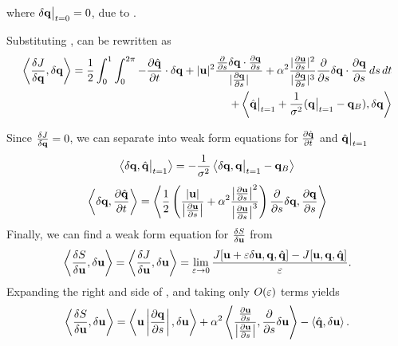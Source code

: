 \documentclass[a4paper, 12pt]{article}
\begin{document}
where $\delta \mathbf{q}\big|_{t=0} = 0$, due to .

Substituting ,  can be rewritten as 
\begin{equation}
\begin{split}
  \label{eq:dJdq-adjoint}
  \left\langle \frac{\delta J}{\delta \mathbf{q}}, \delta \mathbf{q} \right\rangle =
  \frac{1}{2}\int^1_0\int^{2\pi}_0 -\frac{\partial \hat{\mathbf{q}}}{\partial t}\cdot \delta \mathbf{q} + |\mathbf{u}|^2
  \frac{\frac{\partial }{\partial s}\delta \mathbf{q} \cdot \frac{\partial \mathbf{q}}{\partial s}}{|\frac{\partial \mathbf{q}}{\partial s}|}
    + \alpha^2 \frac{|\frac{\partial \mathbf{u}}{\partial s}|^2}{|\frac{\partial \mathbf{q}}{\partial s}|^3} \frac{\partial }{\partial s}\delta \mathbf{q} \cdot \frac{\partial \mathbf{q}}{\partial s} \,ds\,dt \\
    + \left\langle  \hat{\mathbf{q}} \big|_{t=1} + \frac{1}{\sigma^2}(\mathbf{q} \big|_{t=1} -
      \mathbf{q}_B), \delta \mathbf{q} \right\rangle
\end{split}
\end{equation}

Since $\frac{\delta J}{\delta \mathbf{q}} = 0$, we can separate  into weak form equations for $\frac{\partial \hat{\mathbf{q}}}{\partial t}$ and $\hat{\mathbf{q}} \big|_{t=1}$
  \begin{equation}
    \label{eq:qh_t1}
    \left\langle \delta \mathbf{q}, \hat{\mathbf{q}}\big|_{t=1} \right\rangle = -
    \frac{1}{\sigma^2}\left\langle \delta \mathbf{q}, \mathbf{q} \big|_{t=1} - \mathbf{q}_B \right\rangle
  \end{equation}
  \begin{equation}
    \label{eq:dqhdt}
    \left\langle \delta \mathbf{q}, \frac{\partial \hat{\mathbf{q}}}{\partial t} \right\rangle = 
    \left\langle \frac{1}{2}\left(\frac{\left|\mathbf{u}\right|}
        {\left|\frac{\partial \mathbf{u}}{\partial s}\right|} + 
        \alpha^2\frac{\left|\frac{\partial \mathbf{u}}{\partial s}\right|^2}
        {\left|\frac{\partial \mathbf{u}}{\partial s}\right|^3}\right)\frac{\partial }{\partial s}\delta \mathbf{q}, 
      \frac{\partial \mathbf{q}}{\partial s} \right\rangle
  \end{equation}
Finally, we can find a weak form equation for $\frac{\delta S}{\delta \mathbf{u}}$ from
\begin{equation}
  \label{eq:var_dSdu-dJdu}
  \left\langle \frac{\delta S}{\delta \mathbf{u}}, \delta \mathbf{u} \right\rangle = \left\langle \frac{\delta J}{\delta \mathbf{u}}, 
    \delta \mathbf{u} \right\rangle =
  \lim_{\varepsilon \rightarrow 0} \frac{J[\mathbf{u} + \varepsilon \delta \mathbf{u}, \mathbf{q},
    \hat{\mathbf{q}}] 
    - J[\mathbf{u}, \mathbf{q}, \hat{\mathbf{q}}]}{\varepsilon}.
\end{equation}
Expanding the right and side of , and taking only $O(\varepsilon)$
terms yields
\begin{equation}
  \label{eq:dSdu-deltau}
  \left\langle \frac{\delta S}{\delta \mathbf{u}}, \delta \mathbf{u} \right\rangle = \left\langle \mathbf{u} \left|\frac{\partial \mathbf{q}}{\partial s}\right|,\delta \mathbf{u} \right\rangle 
  + \alpha^2 \left\langle \frac{\frac{\partial \mathbf{u}}{\partial s}}{\left|\frac{\partial \mathbf{u}}{\partial s}\right|},\frac{\partial }{\partial s}\delta \mathbf{u} \right\rangle
    - \left\langle \hat{\mathbf{q}},\delta \mathbf{u} \right\rangle.
\end{equation}
\end{document}
